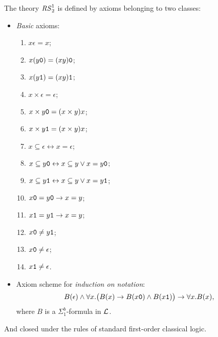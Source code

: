 





\begin{defn}[Theory $\RS$]
  \label{def:S13}
The theory $\RS$ is defined by
axioms belonging to two classes:
\begin{itemize}
\itemsep0em
\item \emph{Basic} axioms:
\begin{enumerate}
\itemsep0em
\item $x\epsilon=x$;
\item $x(y\mathtt{0})=(xy)\mathtt{0}$;
\item $x(y\mathtt{1})=(xy)\mathtt{1}$;
\item $x\times \epsilon=\epsilon$;
\item $x\times y\mathtt{0}=(x\times y)x$;
\item $x\times y\mathtt{1} =(x\times y)x$;
\item $x\subseteq \epsilon \leftrightarrow
x=\epsilon$;
\item $x\subseteq y\mathtt{0} \leftrightarrow
x\subseteq y \vee x=y\mathtt{0}$;
\item $x\subseteq y\mathtt{1} \leftrightarrow
x\subseteq y \vee x=y\mathtt{1}$;
\item $x\mathtt{0}=y\mathtt{0} \rightarrow x=y$;
\item $x\mathtt{1}=y\mathtt{1} \rightarrow x=y$;
\item $x\mathtt{0}\neq y\mathtt{1}$;
\item $x\mathtt{0}\neq \epsilon$;
\item $x\mathtt{1} \neq \epsilon$.
\end{enumerate}

\item Axiom scheme for \emph{induction on
notation}:
$$
B(\epsilon) \wedge \forall x.\big(B(x)
\rightarrow B(x\mathtt{0})\wedge B(x\mathtt{1})\big)
\rightarrow \forall x.B(x),
$$
where $B$ is a $\Sigma^b_1$-formula
in $\mathcal{L}$.
\end{itemize}
And closed under the rules of standard first-order classical logic.
\end{defn}
\noindent

%
